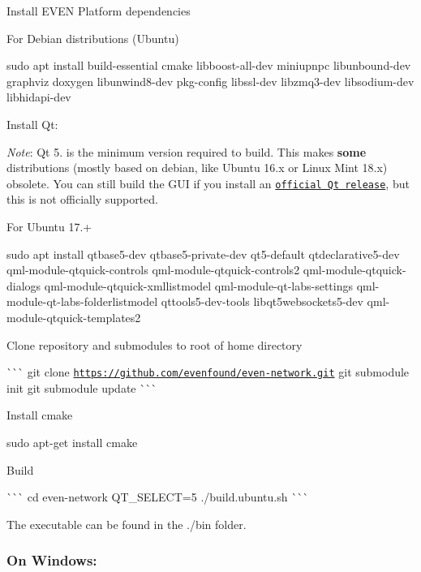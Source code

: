 \begin{DoxyEnumerate}
\item Install E\+V\+EN Platform dependencies
\begin{DoxyItemize}
\item For Debian distributions (Ubuntu)

{\ttfamily sudo apt install build-\/essential cmake libboost-\/all-\/dev miniupnpc libunbound-\/dev graphviz doxygen libunwind8-\/dev pkg-\/config libssl-\/dev libzmq3-\/dev libsodium-\/dev libhidapi-\/dev}
\end{DoxyItemize}
\item Install Qt\+:

{\itshape Note}\+: Qt 5. is the minimum version required to build. This makes {\bfseries some} distributions (mostly based on debian, like Ubuntu 16.\+x or Linux Mint 18.\+x) obsolete. You can still build the G\+UI if you install an \href{https://wiki.qt.io/Install_Qt_5_on_Ubuntu}{\tt official Qt release}, but this is not officially supported.
\begin{DoxyItemize}
\item For Ubuntu 17.+

{\ttfamily sudo apt install qtbase5-\/dev qtbase5-\/private-\/dev qt5-\/default qtdeclarative5-\/dev qml-\/module-\/qtquick-\/controls qml-\/module-\/qtquick-\/controls2 qml-\/module-\/qtquick-\/dialogs qml-\/module-\/qtquick-\/xmllistmodel qml-\/module-\/qt-\/labs-\/settings qml-\/module-\/qt-\/labs-\/folderlistmodel qttools5-\/dev-\/tools libqt5websockets5-\/dev qml-\/module-\/qtquick-\/templates2}
\end{DoxyItemize}
\item Clone repository and submodules to root of home directory

\`{}\`{}\`{} git clone \href{https://github.com/evenfound/even-network.git}{\tt https\+://github.\+com/evenfound/even-\/network.\+git} git submodule init git submodule update \`{}\`{}\`{}
\item Install cmake

{\ttfamily sudo apt-\/get install cmake}
\item Build

\`{}\`{}\`{} cd even-\/network Q\+T\+\_\+\+S\+E\+L\+E\+CT=5 ./build.ubuntu.\+sh \`{}\`{}\`{}
\end{DoxyEnumerate}

The executable can be found in the ./bin folder.

\subsubsection*{On Windows\+:}

